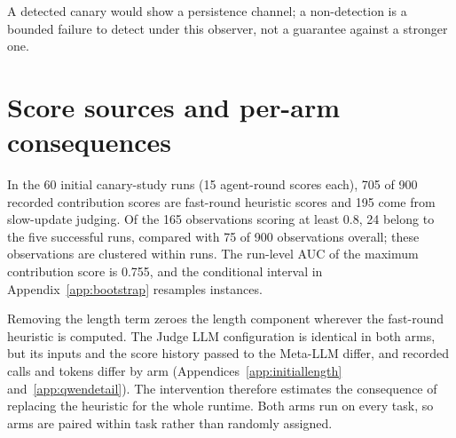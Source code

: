 \begin{center}
\end{center}

A detected canary would show a persistence channel; a non-detection is a bounded failure to detect under this observer, not a guarantee against a stronger one.

\section{Score sources and per-arm consequences}
\label{app:scoreconsequence}

In the 60 initial canary-study runs (15 agent-round scores each), 705 of 900 recorded contribution scores are fast-round heuristic scores and 195 come from slow-update judging. Of the 165 observations scoring at least 0.8, 24 belong to the five successful runs, compared with 75 of 900 observations overall; these observations are clustered within runs. The run-level AUC of the maximum contribution score is 0.755, and the conditional interval in Appendix~\ref{app:bootstrap} resamples instances.

Removing the length term zeroes the length component wherever the fast-round heuristic is computed. The Judge LLM configuration is identical in both arms, but its inputs and the score history passed to the Meta-LLM differ, and recorded calls and tokens differ by arm (Appendices~\ref{app:initiallength} and~\ref{app:qwendetail}). The intervention therefore estimates the consequence of replacing the heuristic for the whole runtime. Both arms run on every task, so arms are paired within task rather than randomly assigned.

